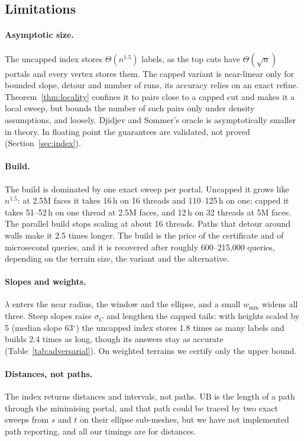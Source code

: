 \documentclass[sigconf,nonacm,screen]{acmart}
\newcommand{\UB}{\mathrm{UB}}
\begin{document}
\subsection{Limitations}

\paragraph{Asymptotic size.}
The uncapped index stores $\Theta(n^{1.5})$ labels, as the top cuts have $\Theta(\sqrt n)$ portals and every vertex
stores them. The capped variant is near-linear only for bounded slope, detour and number of runs, its accuracy
relies on an exact refine. Theorem~\ref{thm:locality} confines it to pairs close to a capped cut and makes it a
local sweep, but bounds the number of such pairs only under density assumptions, and loosely. Djidjev and Sommer's
oracle is asymptotically smaller in theory. In floating point the guarantees are validated, not proved
(Section~\ref{sec:index}).

\paragraph{Build.}
The build is dominated by one exact sweep per portal. Uncapped it grows like $n^{1.5}$: at 2.5M faces it takes
16\,h on 16 threads and 110--125\,h on one; capped it takes 51--52\,h on one thread at 2.5M faces, and 12\,h on 32
threads at 5M faces. The parallel build stops scaling at about 16 threads. Paths that detour around walls make it 2.5 times longer. The build is the price of the certificate and of microsecond queries, and it is recovered after roughly
600--215,000 queries, depending on the terrain size, the variant and the alternative.

\paragraph{Slopes and weights.}
$\lambda$ enters the near radius, the window and the ellipse, and a small $w_{\min}$ widens all three. Steep
slopes raise $\sigma_C$ and lengthen the capped tails: with heights scaled by 5 (median slope 63$^\circ$) the
uncapped index stores 1.8 times as many labels and builds 2.4 times as long, though its answers stay as accurate
(Table~\ref{tab:adversarial}). On weighted terrains we certify only the upper bound.

\paragraph{Distances, not paths.}
The index returns distances and intervals, not paths. $\UB$ is the length of a path through the minimising portal,
and that path could be traced by two exact sweeps from $s$ and $t$ on their ellipse sub-meshes, but we have not
implemented path reporting, and all our timings are for distances.
\end{document}
